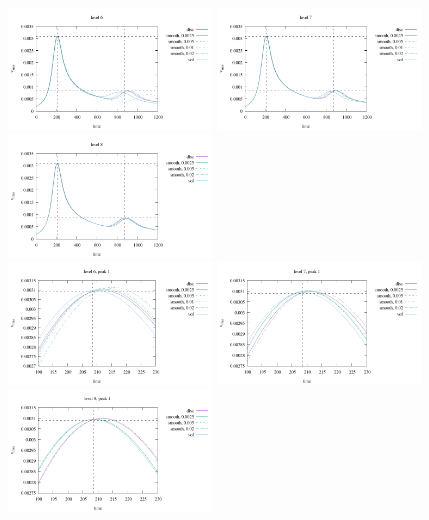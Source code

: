 \begin{itemize}
\begin{minipage}{.99\linewidth}
\begin{center}
\includegraphics[width=5.4cm]{images/benchmark_vaks97/vrms6}
\includegraphics[width=5.4cm]{images/benchmark_vaks97/vrms7}
\includegraphics[width=5.4cm]{images/benchmark_vaks97/vrms8}\\
\includegraphics[width=5.4cm]{images/benchmark_vaks97/vrms6_peak1}
\includegraphics[width=5.4cm]{images/benchmark_vaks97/vrms7_peak1}
\includegraphics[width=5.4cm]{images/benchmark_vaks97/vrms8_peak1}\\

\end{center}
\end{minipage}
\end{itemize}
